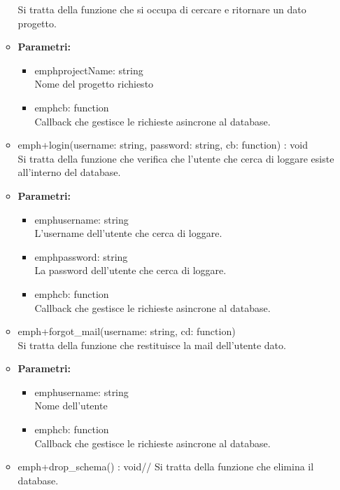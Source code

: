\begin{itemize}
\begin{itemize}
            Si tratta della funzione che si occupa di cercare e ritornare un dato progetto.
            \item \textbf{Parametri: }\\
            \begin{itemize}
              \item emph{projectName: string}\\
              Nome del progetto richiesto
              \item emph{cb: function}\\
              Callback che gestisce le richieste asincrone al database.
            \end{itemize}
            \item emph{+login(username: string, password: string, cb: function) : void}\\
            Si tratta della funzione che verifica che l'utente che cerca di loggare esiste all'interno del database.
            \item \textbf{Parametri: }\\
            \begin{itemize}
              \item emph{username: string}\\
              L'username dell'utente che cerca di loggare.
              \item emph{password: string}\\
              La password dell'utente che cerca di loggare.
              \item emph{cb: function}\\
              Callback che gestisce le richieste asincrone al database.
            \end{itemize}
            \item emph{+forgot_mail(username: string, cd: function)}\\
            Si tratta della funzione che restituisce la mail dell'utente dato.
            \item \textbf{Parametri: }\\
            \begin{itemize}
              \item emph{username: string}\\
              Nome dell'utente
              \item emph{cb: function}\\
              Callback che gestisce le richieste asincrone al database.
            \end{itemize}
            \item emph{+drop_schema() : void}//
            Si tratta della funzione che elimina il database.
          \end{itemize}
        \end{itemize}

